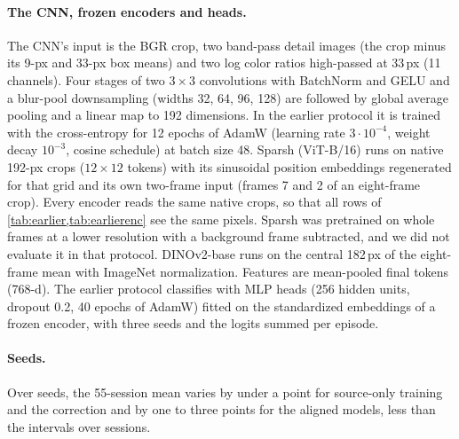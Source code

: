 \documentclass[10pt,twocolumn,letterpaper]{article}
\begin{document}
\paragraph{The CNN, frozen encoders and heads.} The CNN's input is the BGR crop, two band-pass detail images (the crop minus its 9-px and 33-px box means) and two log color ratios high-passed at 33\,px (11 channels). Four stages of two $3\times3$ convolutions with BatchNorm and GELU and a blur-pool downsampling (widths 32, 64, 96, 128) are followed by global average pooling and a linear map to 192 dimensions. In the earlier protocol it is trained with the cross-entropy for 12 epochs of AdamW (learning rate $3\cdot10^{-4}$, weight decay $10^{-3}$, cosine schedule) at batch size 48. Sparsh (ViT-B/16) runs on native 192-px crops ($12\times12$ tokens) with its sinusoidal position embeddings regenerated for that grid and its own two-frame input (frames 7 and 2 of an eight-frame crop). Every encoder reads the same native crops, so that all rows of \cref{tab:earlier,tab:earlierenc} see the same pixels. Sparsh was pretrained on whole frames at a lower resolution with a background frame subtracted, and we did not evaluate it in that protocol. DINOv2-base runs on the central 182\,px of the eight-frame mean with ImageNet normalization. Features are mean-pooled final tokens (768-d). The earlier protocol classifies with MLP heads (256 hidden units, dropout 0.2, 40 epochs of AdamW) fitted on the standardized embeddings of a frozen encoder, with three seeds and the logits summed per episode.

\paragraph{Seeds.} Over seeds, the 55-session mean varies by under a point for source-only training and the correction and by one to three points for the aligned models, less than the intervals over sessions.
\end{document}
